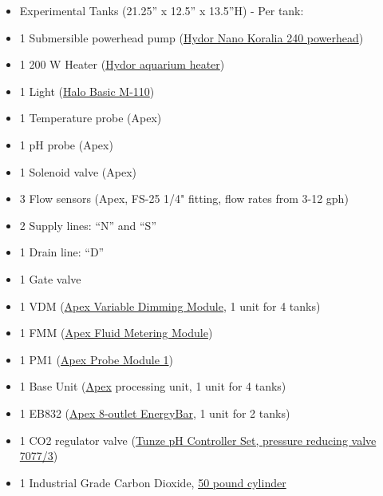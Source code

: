 \documentclass[]{book}
\providecommand{\tightlist}{%
  \setlength{\itemsep}{0pt}\setlength{\parskip}{0pt}}
\begin{document}
\begin{itemize}
\tightlist
\item
  Experimental Tanks (21.25'' x 12.5'' x 13.5''H) - Per tank:\\
\item
  1 Submersible powerhead pump
  (\href{/Manuals/Hydor_Nano_Pump.pdf}{Hydor Nano Koralia 240
  powerhead})\\
\item
  1 200 W Heater (\href{/Manuals/Hydor_Heater.pdf}{Hydor aquarium
  heater})\\
\item
  1 Light (\href{/Manuals/Apex_Halo.pdf}{Halo Basic M-110})\\
\item
  1 Temperature probe (Apex)\\
\item
  1 pH probe (Apex)\\
\item
  1 Solenoid valve (Apex)\\
\item
  3 Flow sensors (Apex, FS-25 1/4" fitting, flow rates from 3-12 gph)\\
\item
  2 Supply lines: ``N'' and ``S''
\item
  1 Drain line: ``D''
\item
  1 Gate valve\\
\item
  1 VDM (\href{/Manuals/VDM_manual.pdf}{Apex Variable Dimming Module}, 1
  unit for 4 tanks)\\
\item
  1 FMM (\href{https://www.neptunesystems.com/getstarted/fmk/}{Apex
  Fluid Metering Module})\\
\item
  1 PM1 (\href{/Manuals/PM1_manual.pdf}{Apex Probe Module 1})\\
\item
  1 Base Unit
  (\href{/Manuals/Apex_Comprehensive_Reference_Manual.pdf}{Apex}
  processing unit, 1 unit for 4 tanks)\\
\item
  1 EB832 (\href{/Manuals/EB832_Guide.pdf}{Apex 8-outlet EnergyBar}, 1
  unit for 2 tanks)\\
\item
  1 CO2 regulator valve (\href{/Manuals/Tunze_CO2_Regulator.pdf}{Tunze
  pH Controller Set, pressure reducing valve 7077/3})\\
\item
  1 Industrial Grade Carbon Dioxide,
  \href{https://www.airgas.com/product/Gases/Industrial-Application-Gases/Carbon-Dioxide---Industrial/p/CD\%2050}{50
  pound cylinder}
\end{itemize}
\end{document}
